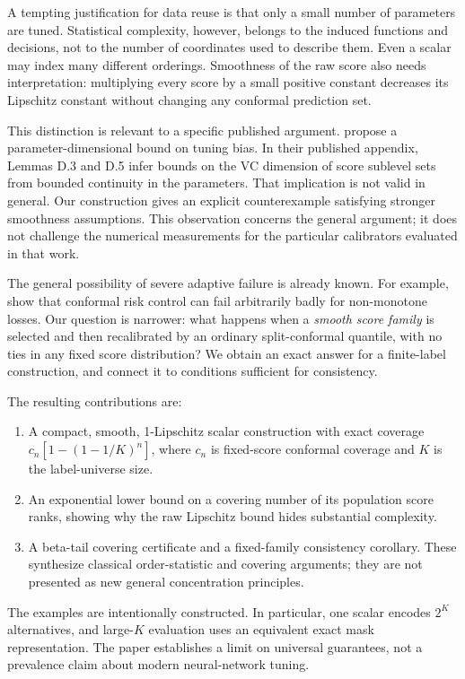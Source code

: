 \documentclass{article}
\begin{document}
A tempting justification for data reuse is that only a small number of parameters are tuned. Statistical complexity, however, belongs to the induced functions and decisions, not to the number of coordinates used to describe them. Even a scalar may index many different orderings. Smoothness of the raw score also needs interpretation: multiplying every score by a small positive constant decreases its Lipschitz constant without changing any conformal prediction set.

This distinction is relevant to a specific published argument. \citet{zeng2025} propose a parameter-dimensional bound on tuning bias. In their published appendix, Lemmas D.3 and D.5 infer bounds on the VC dimension of score sublevel sets from bounded continuity in the parameters. That implication is not valid in general. Our construction gives an explicit counterexample satisfying stronger smoothness assumptions. This observation concerns the general argument; it does not challenge the numerical measurements for the particular calibrators evaluated in that work.

The general possibility of severe adaptive failure is already known. For example, \citet{crc2024} show that conformal risk control can fail arbitrarily badly for non-monotone losses. Our question is narrower: what happens when a \emph{smooth score family} is selected and then recalibrated by an ordinary split-conformal quantile, with no ties in any fixed score distribution? We obtain an exact answer for a finite-label construction, and connect it to conditions sufficient for consistency.

The resulting contributions are:
\begin{enumerate}
\item A compact, smooth, 1-Lipschitz scalar construction with exact coverage $c_n[1-(1-1/K)^n]$, where $c_n$ is fixed-score conformal coverage and $K$ is the label-universe size.
\item An exponential lower bound on a covering number of its population score ranks, showing why the raw Lipschitz bound hides substantial complexity.
\item A beta-tail covering certificate and a fixed-family consistency corollary. These synthesize classical order-statistic and covering arguments; they are not presented as new general concentration principles.
\end{enumerate}

The examples are intentionally constructed. In particular, one scalar encodes $2^K$ alternatives, and large-$K$ evaluation uses an equivalent exact mask representation. The paper establishes a limit on universal guarantees, not a prevalence claim about modern neural-network tuning.
\end{document}
